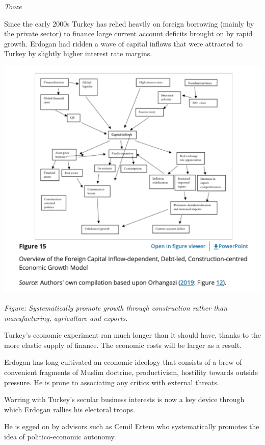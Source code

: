 \documentclass[
]{book}
\begin{document}
\emph{Tooze}

Since the early 2000s Turkey has relied heavily on foreign borrowing (mainly by the private sector) to finance large current account deficits brought on by rapid growth.
Erdogan had ridden a wave of capital inflows that were attracted to Turkey by slightly higher interest rate margins.

\includegraphics{fig/turkey_model.png}

\emph{Figure: Systematically promote growth through construction rather than manufacturing, agriculture and exports.}

Turkey's economic experiment ran much longer than it should have, thanks to the more elastic supply of finance. The economic costs will be larger as a result.

Erdogan has long cultivated an economic ideology that consists of a brew of convenient fragments of Muslim doctrine, productivism, hostility towards outside pressure. He is prone to associating any critics with external threats.

Warring with Turkey's secular business interests is now a key device through which Erdogan rallies his electoral troops.

He is egged on by advisors such as Cemil Ertem who systematically promotes the idea of politico-economic autonomy.
\end{document}
